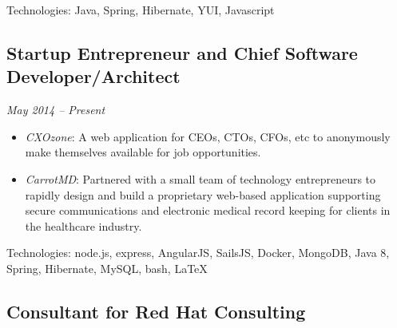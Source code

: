 \documentclass[a4paper,11pt]{article}
\begin{document}
Technologies: Java, Spring, Hibernate, YUI, Javascript

\subsection*{Startup Entrepreneur and Chief Software Developer/Architect} 
\vskip -20pt
\hfill \textit{May 2014 -- Present}

\begin{itemize}

  \vskip 5pt
  \item \textit{CXOzone}: A web application for CEOs, CTOs, CFOs, etc to anonymously make themselves
    available for job opportunities.

  \item \textit{CarrotMD}: Partnered with a small team of technology entrepreneurs to rapidly design
    and build a proprietary web-based application supporting secure communications and electronic
    medical record keeping for clients in the healthcare industry.

\end{itemize}

Technologies: node.js, express, AngularJS, SailsJS, Docker, MongoDB, Java 8, Spring, Hibernate,
MySQL, bash, \LaTeX

\subsection*{Consultant for Red Hat Consulting}
\end{document}
